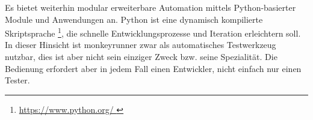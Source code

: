 Es bietet weiterhin modular erweiterbare Automation mittels Python-basierter
Module und Anwendungen an. Python ist eine dynamisch kompilierte Skriptsprache
\footnote{ \url{ https://www.python.org/ }}, die schnelle Entwicklungsprozesse
und Iteration erleichtern soll. In dieser Hinsicht ist monkeyrunner zwar
als automatisches Testwerkzeug nutzbar, dies ist aber nicht sein einziger
Zweck bzw. seine Spezialität. Die Bedienung erfordert aber in jedem Fall
einen Entwickler, nicht einfach nur einen Tester.
